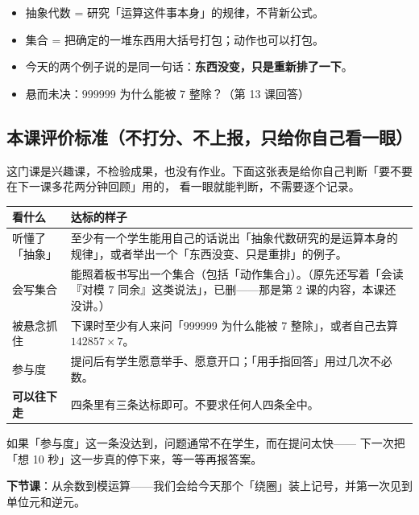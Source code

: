 \begin{xiaojie}
  \begin{itemize}
    \item 抽象代数 = 研究「运算这件事本身」的规律，不背新公式。
    \item 集合 = 把确定的一堆东西用大括号打包；动作也可以打包。
    \item 今天的两个例子说的是同一句话：\textbf{东西没变，只是重新排了一下}。
    \item 悬而未决：\(999999\) 为什么能被 7 整除？（第 13 课回答）
  \end{itemize}
\end{xiaojie}

\subsection*{本课评价标准（不打分、不上报，只给你自己看一眼）}

这门课是兴趣课，不检验成果，也没有作业。下面这张表是给你自己判断「要不要在下一课多花两分钟回顾」用的，
看一眼就能判断，不需要逐个记录。

\begin{center}
\begin{tabular}{@{}>{\raggedright\arraybackslash}p{3.4cm}>{\raggedright\arraybackslash}p{10.4cm}@{}}
\toprule
\textbf{看什么} & \textbf{达标的样子} \\
\midrule
听懂了「抽象」 & 至少有一个学生能用自己的话说出「抽象代数研究的是运算本身的规律」，或者举出一个「东西没变、只是重排」的例子。\\
会写集合 & 能照着板书写出一个集合（包括「动作集合」）。（原先还写着「会读『对模 \(7\) 同余』这类说法」，已删——那是第 2 课的内容，本课还没讲。）\\
被悬念抓住 & 下课时至少有人来问「999999 为什么能被 7 整除」，或者自己去算 \(142857\times7\)。\\
参与度 & 提问后有学生愿意举手、愿意开口；「用手指回答」用过几次不必数。\\
\midrule
\textbf{可以往下走} & 四条里有三条达标即可。不要求任何人四条全中。\\
\bottomrule
\end{tabular}
\end{center}

\begin{zhu}
  如果「参与度」这一条没达到，问题通常不在学生，而在提问太快——
  下一次把「想 10 秒」这一步真的停下来，等一等再报答案。
\end{zhu}

\noindent\textbf{下节课}：从余数到模运算——我们会给今天那个「绕圈」装上记号，并第一次见到单位元和逆元。